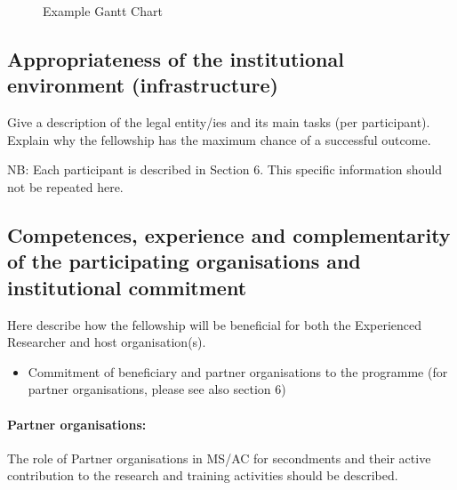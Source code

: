 \begin{landscape}
\begin{figure}[htbp]
\begin{center}
    \end{center}
    \caption{Example Gantt Chart}
  \end{figure}

\end{landscape}

\newpage

\subsection{Appropriateness of the institutional environment (infrastructure)}
\label{sec:institution}

Give a description of the legal entity/ies and its main tasks (per participant).
Explain why the fellowship has the maximum chance of a successful outcome.

NB: Each participant is described in Section 6. This specific information should not be repeated here.

\subsection{Competences, experience and complementarity of the participating organisations and institutional commitment}
\label{sec:competences}

Here describe how the fellowship will be beneficial for both the Experienced Researcher and host organisation(s).
\begin{itemize}
\item Commitment of beneficiary and partner organisations to the programme (for partner organisations, please see also section 6)
\end{itemize}

\paragraph{Partner organisations:}
The role of Partner organisations in MS/AC for secondments and their active contribution to the research and training activities should be described.
